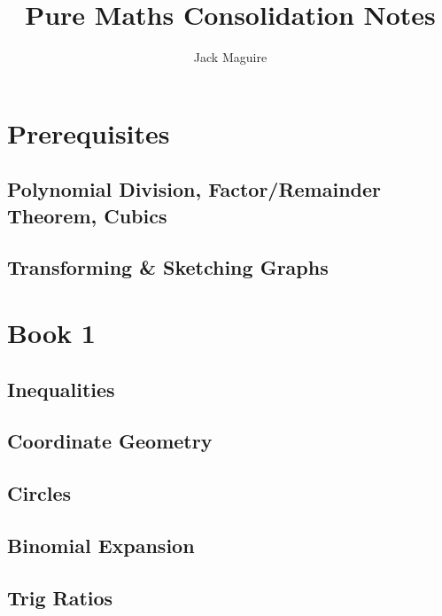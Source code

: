 \documentclass{report}
\title{\huge{Pure Maths Consolidation Notes}}
\author{\huge{Jack Maguire}}
\date{}
\begin{document}
\maketitle

\tableofcontents
\pagebreak

\part{Prerequisites}
\chapter{Polynomial Division, Factor/Remainder Theorem, Cubics}

\chapter{Transforming \& Sketching Graphs}



\part{Book 1}

\setcounter{chapter}{2}
\chapter{Inequalities}


\setcounter{chapter}{4}
\chapter{Coordinate Geometry}


\chapter{Circles}


\setcounter{chapter}{7}
\chapter{Binomial Expansion}


\chapter{Trig Ratios}

\end{document}
